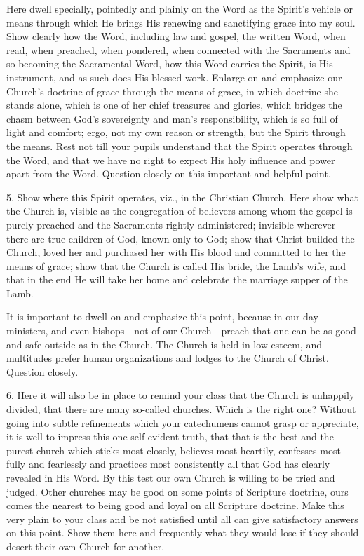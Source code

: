 Here dwell specially, pointedly and plainly on the Word as the Spirit’s vehicle or means through which
 He brings His renewing and sanctifying grace into my soul. Show clearly how the Word, including law and gospel, the written Word, when read, when preached, when pondered, when connected with the Sacraments and so becoming the Sacramental Word, how this Word carries the Spirit, is His instrument, and as such does His blessed work. Enlarge on and emphasize our Church’s doctrine of grace through the means of grace, in which doctrine she stands alone, which is one of her chief treasures and glories, which bridges the chasm between God’s sovereignty and man’s responsibility, which is so full of light and comfort; ergo, not my own reason or strength, but the Spirit through the means. Rest not till your pupils understand that the Spirit operates through the Word, and that we have no right to expect His holy influence and power apart from the Word. Question closely on this important and helpful point.

 5. Show where this Spirit operates, viz., in the Christian Church. Here show what the Church is, visible as the congregation of believers among whom the gospel is purely preached and the Sacraments rightly administered; invisible wherever there are true children of God, known only to God; show that Christ builded the Church, loved her and purchased her with His blood and committed to her the means of grace; show that the Church is called
His bride, the Lamb’s wife, and that in the end He will take her home and celebrate the marriage supper of the Lamb.

It is important to dwell on and emphasize this point, because in our day ministers, and even bishops—not of our Church—preach that one can be as good and safe outside as in the Church. The Church is held in low esteem, and multitudes prefer human organizations and lodges to the Church of Christ. Question closely.

 6. Here it will also be in place to remind your class that the Church is unhappily divided, that there are many so-called churches. Which is the right one? Without going into subtle refinements which your catechumens cannot grasp or appreciate, it is well to impress this one self-evident truth, that that is the best and the purest church which sticks most closely, believes most heartily, confesses most fully and fearlessly and practices most consistently all that God has clearly revealed in His Word. By this test our own Church is willing to be tried and judged. Other churches may be good on some points of Scripture doctrine, ours comes the nearest to being good and loyal on all Scripture doctrine. Make this very plain to your class and be not satisfied until all can give satisfactory answers on this point. Show them here and frequently what they would lose if they should desert their own Church for another.

